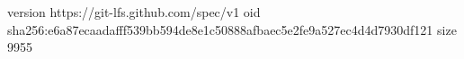 version https://git-lfs.github.com/spec/v1
oid sha256:e6a87ecaadafff539bb594de8e1c50888afbaec5e2fe9a527ec4d4d7930df121
size 9955
